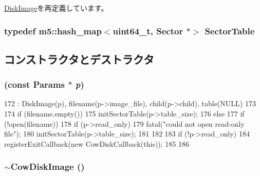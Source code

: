 \hyperlink{classDiskImage_a7fcdce57df9801d7eebcb65f9ad2e0c0}{DiskImage}を再定義しています。\hypertarget{classCowDiskImage_a22b16d3053a4078053e44e56fe64875d}{
\subsubsection[{SectorTable}]{\setlength{\rightskip}{0pt plus 5cm}typedef m5::hash\_\-map$<$uint64\_\-t, {\bf Sector} $\ast$$>$ {\bf SectorTable}}}
\label{classCowDiskImage_a22b16d3053a4078053e44e56fe64875d}


\subsection{コンストラクタとデストラクタ}
\hypertarget{classCowDiskImage_ad27dd208186bea9d387d4f83cf605679}{
\subsubsection[{CowDiskImage}]{ (const {\bf Params} $\ast$ {\em p})}}
\label{classCowDiskImage_ad27dd208186bea9d387d4f83cf605679}



\begin{DoxyCode}
172     : DiskImage(p), filename(p->image_file), child(p->child), table(NULL)
173 {
174     if (filename.empty()) {
175         initSectorTable(p->table_size);
176     } else {
177         if (!open(filename)) {
178             if (p->read_only)
179                 fatal("could not open read-only file");
180             initSectorTable(p->table_size);
181         }
182 
183         if (!p->read_only)
184             registerExitCallback(new CowDiskCallback(this));
185     }
186 }
\end{DoxyCode}
\hypertarget{classCowDiskImage_a95d88dc63c0c2dd7c28f255cfbe2e8f5}{
\subsubsection[{$\sim$CowDiskImage}]{\setlength{\rightskip}{0pt plus 5cm}$\sim${\bf CowDiskImage} ()}}
\label{classCowDiskImage_a95d88dc63c0c2dd7c28f255cfbe2e8f5}



